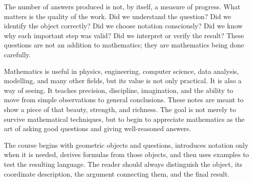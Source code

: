 The number of answers produced is not, by itself, a measure of progress. What
matters is the quality of the work. Did we understand the question? Did we
identify the object correctly? Did we choose notation consciously? Did we know
why each important step was valid? Did we interpret or verify the result? These
questions are not an addition to mathematics; they are mathematics being done
carefully.

Mathematics is useful in physics, engineering, computer science, data analysis,
modelling, and many other fields, but its value is not only practical. It is
also a way of seeing. It teaches precision, discipline, imagination, and the
ability to move from simple observations to general conclusions. These notes
are meant to show a piece of that beauty, strength, and richness. The goal is
not merely to survive mathematical techniques, but to begin to appreciate
mathematics as the art of asking good questions and giving well-reasoned
answers.

The course begins with geometric objects and questions, introduces notation only
when it is needed, derives formulas from those objects, and then uses examples
to test the resulting language. The reader should always distinguish the object,
its coordinate description, the argument connecting them, and the final result.
